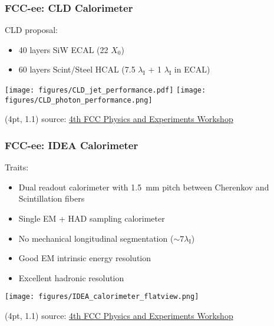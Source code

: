 \documentclass[aspectratio=169]{beamer}
\newcommand{\bluetext}[1]{%
  \textcolor{myBlue}{#1}
}
\begin{document}
\begin{frame}
  \frametitle{FCC-ee: CLD Calorimeter}

  \bluetext{CLD proposal:}
  \begin{itemize}
    \item 40 layers SiW ECAL (22 $X_0$)
    \item 60 layers Scint/Steel HCAL (7.5 $\lambda_\text{I}$ +
          1 $\lambda_\text{I}$ in ECAL)
  \end{itemize}

  \begin{center}
    \texttt{[image: figures/CLD\_jet\_performance.pdf]}
    \hspace{7mm}
    \texttt{[image: figures/CLD\_photon\_performance.png]}
  \end{center}

  \begin{textblock*}{\paperwidth}(4pt, 1.1\textheight)
    \tiny source:
    \href{https://indico.cern.ch/event/932973/}
         {4th FCC Physics and Experiments Workshop}
  \end{textblock*}
\end{frame}


\begin{frame}
  \frametitle{FCC-ee: IDEA Calorimeter}

  \bluetext{Traits:}
  \begin{itemize}
    \item Dual readout calorimeter with 1.5~mm pitch between
          Cherenkov and Scintillation fibers
    \item Single EM + HAD sampling calorimeter
    \item No mechanical longitudinal segmentation ($\sim 7 \lambda_\text{I}$)
    \item Good EM intrinsic energy resolution
    \item Excellent hadronic resolution
  \end{itemize}

  \vspace*{-2.1ex}
  \begin{center}
    \texttt{[image: figures/IDEA\_calorimeter\_flatview.png]}
  \end{center}

  \begin{textblock*}{\paperwidth}(4pt, 1.1\textheight)
    \tiny source:
    \href{https://indico.cern.ch/event/932973/}
         {4th FCC Physics and Experiments Workshop}
  \end{textblock*}
\end{frame}
\end{document}
